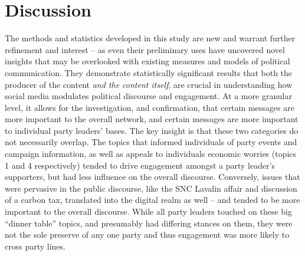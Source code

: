 \section{Discussion}

    
The methods and statistics developed in this study are new and warrant further
refinement and interest -- as even their preliminary uses have uncovered novel
insights that may be overlooked with existing measures and models of political
communication. They demonstrate statistically significant results that both the
producer of the content \emph{and the content itself}, are crucial in
understanding how social media modulates political discourse and engagement. At
a more granular level, it allows for the investigation, and confirmation, that
certain messages are more important to the overall network, and certain messages
are more important to individual party leaders' bases. The key insight is that
these two categories do not necessarily overlap.  The topics that informed
individuals of party events and campaign information, as well as appeals to
individuals economic worries (topics 1 and 4 respectively) tended to drive
engagement amongst a party leader's supporters, but had less influence on the
overall discourse. Conversely, issues that were pervasive in the public
discourse, like the SNC Lavalin affair and discussion of a carbon tax,
translated into the digital realm as well -- and tended to be more important to
the overall discourse. While all party leaders touched on these big ``dinner
table'' topics, and presumably had differing stances on them, they were not the
sole preserve of any one party and thus engagement was more likely to cross
party lines. 

